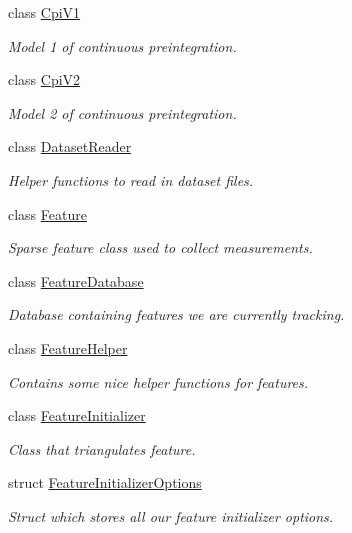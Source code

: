 \begin{DoxyCompactItemize}
class \hyperlink{classov__core_1_1CpiV1}{Cpi\+V1}
\begin{DoxyCompactList}\small\item\em Model 1 of continuous preintegration. \end{DoxyCompactList}\item 
class \hyperlink{classov__core_1_1CpiV2}{Cpi\+V2}
\begin{DoxyCompactList}\small\item\em Model 2 of continuous preintegration. \end{DoxyCompactList}\item 
class \hyperlink{classov__core_1_1DatasetReader}{Dataset\+Reader}
\begin{DoxyCompactList}\small\item\em Helper functions to read in dataset files. \end{DoxyCompactList}\item 
class \hyperlink{classov__core_1_1Feature}{Feature}
\begin{DoxyCompactList}\small\item\em Sparse feature class used to collect measurements. \end{DoxyCompactList}\item 
class \hyperlink{classov__core_1_1FeatureDatabase}{Feature\+Database}
\begin{DoxyCompactList}\small\item\em Database containing features we are currently tracking. \end{DoxyCompactList}\item 
class \hyperlink{classov__core_1_1FeatureHelper}{Feature\+Helper}
\begin{DoxyCompactList}\small\item\em Contains some nice helper functions for features. \end{DoxyCompactList}\item 
class \hyperlink{classov__core_1_1FeatureInitializer}{Feature\+Initializer}
\begin{DoxyCompactList}\small\item\em Class that triangulates feature. \end{DoxyCompactList}\item 
struct \hyperlink{structov__core_1_1FeatureInitializerOptions}{Feature\+Initializer\+Options}
\begin{DoxyCompactList}\small\item\em Struct which stores all our feature initializer options. \end{DoxyCompactList}\item 

\end{DoxyCompactItemize}
